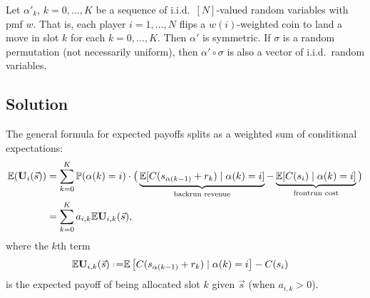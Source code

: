 \begin{example} \label{independent-allocation}

  Let $\alpha'_k$, $k=0,\ldots,K$ be a sequence of i.i.d.~$[N]$-valued random variables with pmf $w$.
  That is, each player $i=1,\ldots,N$ flips a $w(i)$-weighted coin to land a move in slot $k$ for each $k=0,\ldots,K$.
  Then $\alpha'$ is symmetric.
  If $\sigma$ is a random permutation (not necessarily uniform), then $\alpha'\circ\sigma$ is also a vector of i.i.d.~random variables.

\end{example}

\begin{comment}
\begin{example}[Additional imperfect information structures]
\begin{itemize}
\item
  Complete information: \(x_i=\mathcal{H}_N\) for all \(i\).
\item
  Number of orders. \(x_i=\mathbb{N}\), \(h_i(K,\ldots)=K\). This is the coarsest information structure we will consider.
\item
  Number and sequence order of orders, but not size or direction.
\item
  Number and contents of orders, but not sequence order.
  That is, the orders $(\tau_1,\ldots\tau_k)$ are a random permutation $\sigma'$ of a known set $(r_1,\ldots,r_k)$.
\end{itemize}
\end{example}
\end{comment}

\subsection{Solution} \label{solution}

The general formula for expected payoffs splits as a weighted sum of conditional expectations:
\begin{align} \label{expected-utility}
  \Expectation (\Utility_i(\vec{s})) &= %
    \sum_{k=0}^K \Probability(\alpha(k)=i) \cdot \big( %
      \underbrace{\Expectation[C(s_{\alpha(k-1)}+r_k)\mid \alpha(k)=i]}_\text{backrun revenue} - %
      \underbrace{\Expectation[C(s_i)\mid \alpha(k)=i]}_\text{frontrun cost} %
    \big) \\
    &= \sum_{k=0}^K a_{i,k}\Expectation\Utility_{i,k}(\vec{s}),
\end{align}
where the $k$th term 
\begin{align}
  \Expectation\Utility_{i,k}(\vec{s}) \defeq %
    & \Expectation\left[C(s_{\alpha(k-1)}+r_k)\mid \alpha(k)=i\right] - C(s_i)
\end{align}
is the expected payoff of being allocated slot $k$ given $\vec{s}$ (when $a_{i,k}>0$).

